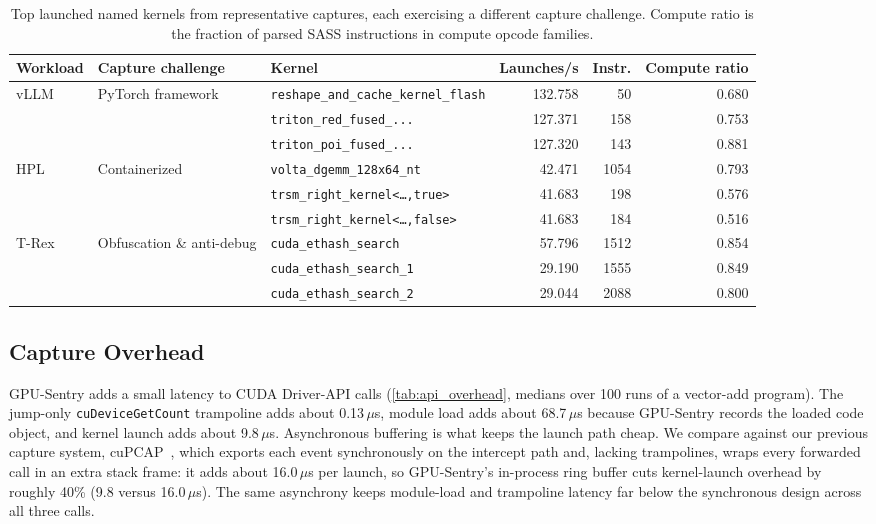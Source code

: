 \begin{table}[t]
    \centering
    \caption{Top launched named kernels from representative captures, each exercising a different capture challenge. Compute ratio is the fraction of parsed SASS instructions in compute opcode families.}
    \label{tab:top_kernels}
    \begin{tabular}{lllrrr}
        \toprule
        Workload & Capture challenge & Kernel & Launches/s & Instr. & Compute ratio \\
        \midrule
        \multirow{3}{*}{vLLM} & \multirow{3}{*}{PyTorch framework} & \texttt{reshape\_and\_cache\_kernel\_flash} & 132.758 & 50 & 0.680 \\
         & & \texttt{triton\_red\_fused\_...} & 127.371 & 158 & 0.753 \\
         & & \texttt{triton\_poi\_fused\_...} & 127.320 & 143 & 0.881 \\
        \midrule
        \multirow{3}{*}{HPL} & \multirow{3}{*}{Containerized} & \texttt{volta\_dgemm\_128x64\_nt} & 42.471 & 1054 & 0.793 \\
         & & \texttt{trsm\_right\_kernel<\dots,true>} & 41.683 & 198 & 0.576 \\
         & & \texttt{trsm\_right\_kernel<\dots,false>} & 41.683 & 184 & 0.516 \\
        \midrule
        \multirow{3}{*}{T-Rex} & \multirow{3}{*}{Obfuscation \& anti-debug} & \texttt{cuda\_ethash\_search} & 57.796 & 1512 & 0.854 \\
         & & \texttt{cuda\_ethash\_search\_1} & 29.190 & 1555 & 0.849 \\
         & & \texttt{cuda\_ethash\_search\_2} & 29.044 & 2088 & 0.800 \\
        \bottomrule
    \end{tabular}
\end{table}


\subsection{Capture Overhead}

GPU-Sentry adds a small latency to CUDA Driver-API calls (\cref{tab:api_overhead}, medians over 100 runs of a vector-add program). The jump-only \texttt{cuDeviceGetCount} trampoline adds about 0.13\,$\mu$s, module load adds about 68.7\,$\mu$s because GPU-Sentry records the loaded code object, and kernel launch adds about 9.8\,$\mu$s. Asynchronous buffering is what keeps the launch path cheap. We compare against our previous capture system, cuPCAP~\cite{kuo2025cupcap}, which exports each event synchronously on the intercept path and, lacking trampolines, wraps every forwarded call in an extra stack frame: it adds about 16.0\,$\mu$s per launch, so GPU-Sentry's in-process ring buffer cuts kernel-launch overhead by roughly 40\% (9.8 versus 16.0\,$\mu$s). The same asynchrony keeps module-load and trampoline latency far below the synchronous design across all three calls.

